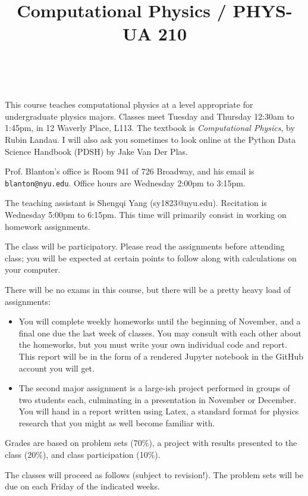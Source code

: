 \documentclass[11pt, preprint]{aastex}
\begin{document}
\title{\bf Computational Physics / PHYS-UA 210}
~
~

\noindent This course teaches computational physics at a level
appropriate for undergraduate physics majors.  Classes meet Tuesday
and Thursday 12:30am to 1:45pm, in 12 Waverly Place, L113.  The
textbook is {\it Computational Physics}, by Rubin Landau. I will also
ask you sometimes to look online at the Python Data Science Handbook
(PDSH) by Jake Van Der Plas.

\noindent Prof. Blanton's office is Room 941 of 726 Broadway, and his
email is {\tt blanton@nyu.edu}.  Office hours are Wednesday 2:00pm to
3:15pm.

\noindent The teaching assistant is Shengqi Yang
(sy1823@nyu.edu). Recitation is Wednesday 5:00pm to 6:15pm. This time
will primarily consist in working on homework assignments.

\noindent The class will be participatory. Please read the assignments
before attending class; you will be expected at certain points to
follow along with calculations on your computer.

\noindent There will be no exams in this course, but there will be a
pretty heavy load of assignments:
\begin{itemize}
\item You will complete weekly homeworks until the beginning of
  November, and a final one due the last week of classes. You may
  consult with each other about the homeworks, but you must write your
  own individual code and report. This report will be in the form of a
  rendered Jupyter notebook in the GitHub account you will get.
\item The second major assignment is a large-ish project performed in
  groups of two students each, culminating in a presentation in
  November or December. You will hand in a report written using Latex,
  a standard format for physics research that you might as well become
  familiar with.
\end{itemize}

\noindent Grades are based on problem sets (70\%), a project with
results presented to the class (20\%), and class participation (10\%).

\noindent The classes will proceed as follows (subject to revision!).
The problem sets will be due on each Friday of the indicated weeks.
\end{document}
